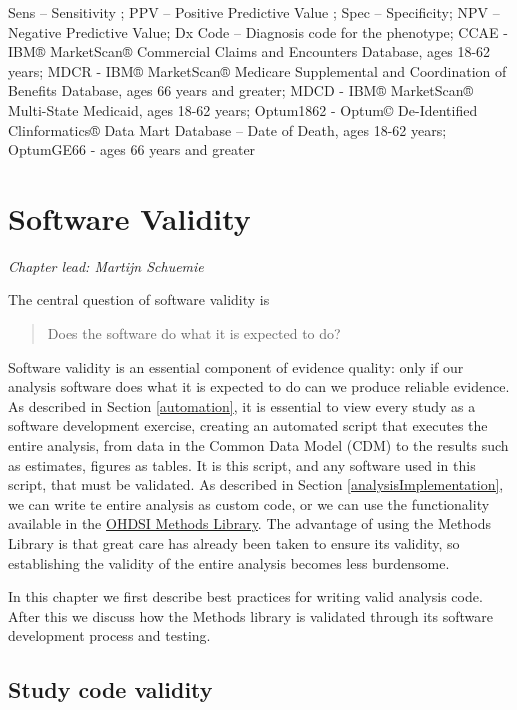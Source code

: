 \documentclass[11pt]{book}
\theoremstyle{definition}
\theoremstyle{definition}
\theoremstyle{definition}
\theoremstyle{remark}
\begin{document}
Sens -- Sensitivity ; PPV -- Positive Predictive Value ; Spec -- Specificity; NPV -- Negative Predictive Value; Dx Code -- Diagnosis code for the phenotype; CCAE - IBM® MarketScan® Commercial Claims and Encounters Database, ages 18-62 years; MDCR - IBM® MarketScan® Medicare Supplemental and Coordination of Benefits Database, ages 66 years and greater; MDCD - IBM® MarketScan® Multi-State Medicaid, ages 18-62 years; Optum1862 - Optum© De-Identified Clinformatics® Data Mart Database -- Date of Death, ages 18-62 years; OptumGE66 - ages 66 years and greater

\hypertarget{SoftwareValidity}{%
\chapter{Software Validity}\label{SoftwareValidity}}

\emph{Chapter lead: Martijn Schuemie}

The central question of software validity is

\begin{quote}
Does the software do what it is expected to do?
\end{quote}

Software validity is an essential component of evidence quality: only if our analysis software does what it is expected to do can we produce reliable evidence. As described in Section \ref{automation}, it is essential to view every study as a software development exercise, creating an automated script that executes the entire analysis, from data in the Common Data Model (CDM) to the results such as estimates, figures as tables. It is this script, and any software used in this script, that must be validated. As described in Section \ref{analysisImplementation}, we can write te entire analysis as custom code, or we can use the functionality available in the \href{https://ohdsi.github.io/MethodsLibrary/}{OHDSI Methods Library}. The advantage of using the Methods Library is that great care has already been taken to ensure its validity, so establishing the validity of the entire analysis becomes less burdensome.

In this chapter we first describe best practices for writing valid analysis code. After this we discuss how the Methods library is validated through its software development process and testing.

\hypertarget{study-code-validity}{%
\section{Study code validity}\label{study-code-validity}}
\end{document}
